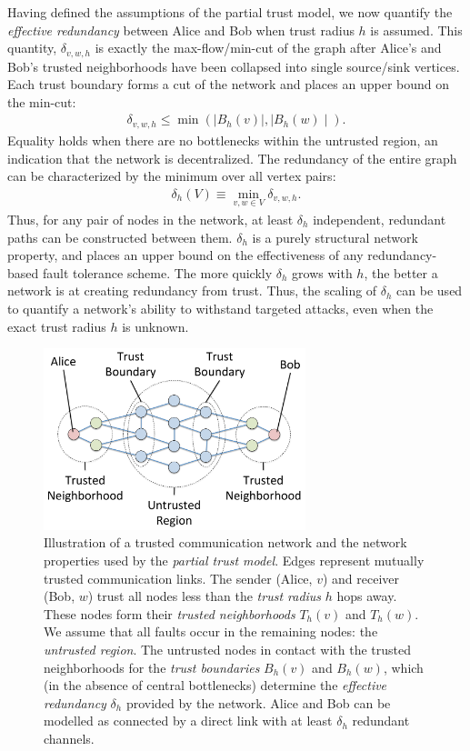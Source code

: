 \documentclass{sig-alternate-05-2015}
\newcommand{\beq}{\begin{eqnarray}}
\newcommand{\eeq}{\end{eqnarray}}
\begin{document}
Having defined the assumptions of the partial trust model,
we now quantify the {\em effective redundancy} between Alice and Bob
when trust radius $h$ is assumed.
This quantity, $\delta_{v,w,h}$ is exactly the max-flow/min-cut of
the graph after Alice's and Bob's trusted neighborhoods have been
collapsed into single source/sink vertices.
Each trust boundary forms a cut of the network and places an upper bound on the
min-cut:
\beq
\delta_{v,w,h} \leq \min\left( \mid B_h(v) \mid, \mid B_h(w) \mid \right).
\eeq
Equality holds when there are no bottlenecks within the untrusted region,
an indication that the network is decentralized.
The redundancy of the entire graph can be characterized by the minimum over
all vertex pairs:
\beq
\delta_h(V) \equiv \min_{v,w \in V} \delta_{v,w,h}.
\eeq
Thus, for any pair of nodes in the network, at least $\delta_h$ independent,
redundant paths can be constructed between them.
$\delta_h$ is a purely structural network property,
and places an upper bound on the effectiveness of any
redundancy-based fault tolerance scheme.
The more quickly $\delta_h$ grows with $h$,
the better a network is at creating redundancy from trust.
Thus, the scaling of $\delta_h$ can be used to quantify a network's ability
to withstand targeted attacks,
even when the exact trust radius $h$ is unknown.

\begin{figure}
\centerline{\includegraphics[width=3in,height=2.08in]{fig-partial-trust}}
\caption{
Illustration of a trusted communication network and the network properties
used by the {\em partial trust model}.
Edges represent mutually trusted communication links.
The sender (Alice, $v$) and receiver (Bob, $w$) trust all nodes
less than the {\em trust radius} $h$ hops away.
These nodes form their {\em trusted neighborhoods} $T_h(v)$ and $T_h(w)$.
We assume that all faults occur in the remaining nodes: the
{\em untrusted region}.
The untrusted nodes in contact with the trusted neighborhoods for the
{\em trust boundaries} $B_h(v)$ and $B_h(w)$,
which (in the absence of central bottlenecks) determine the
{\em effective redundancy} $\delta_h$ provided by the network.
Alice and Bob can be modelled as connected by a direct link with
at least $\delta_h$ redundant channels.
}
\label{fig:trust-source}
\end{figure}
\end{document}
